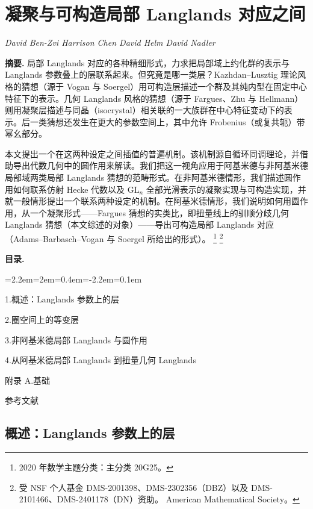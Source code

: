 \chapter{凝聚与可构造局部 Langlands 对应之间}
\begin{center}
{\small\itshape David Ben-Zvi \quad Harrison Chen \quad David Helm \quad David Nadler}
\end{center}
\medskip
\noindent\textbf{摘要.} 局部 Langlands 对应的各种精细形式，力求把局部域上约化群的表示与 Langlands 参数叠上的层联系起来。但究竟是哪一类层？Kazhdan--Lusztig 理论风格的猜想（源于 Vogan 与 Soergel）用可构造层描述一个群及其纯内型在固定中心特征下的表示。几何 Langlands 风格的猜想（源于 Fargues、Zhu 与 Hellmann）则用凝聚层描述与同晶（isocrystal）相关联的一大族群在中心特征变动下的表示。后一类猜想还发生在更大的参数空间上，其中允许 Frobenius（或复共轭）带幂幺部分。

本文提出一个在这两种设定之间插值的普遍机制。该机制源自循环同调理论，并借助导出代数几何中的圆作用来解读。我们把这一视角应用于阿基米德与非阿基米德局部域两类局部 Langlands 猜想的范畴形式。在非阿基米德情形，我们描述圆作用如何联系仿射 Hecke 代数以及 $\mathrm{GL}_n$ 全部光滑表示的凝聚实现与可构造实现，并就一般情形提出一个联系两种设定的机制。在阿基米德情形，我们说明如何用圆作用，从一个凝聚形式——Fargues 猜想的实类比，即扭量线上的驯顺分歧几何 Langlands 猜想（本文综述的对象）——导出可构造局部 Langlands 对应（Adams--Barbasch--Vogan 与 Soergel 所给出的形式）。
\footnote{2020 年数学主题分类：主分类 20G25。}
\footnote{受 NSF 个人基金 DMS-2001398、DMS-2302356（DBZ）以及 DMS-2101466、DMS-2401178（DN）资助。 American Mathematical Society。}

\medskip
\noindent\textbf{目录.}
\begin{list}{}{\leftmargin=2.2em=2em=0.4em\itemindent=-2.2em\itemsep=0.1em}
\item 1.\quad 概述：Langlands 参数上的层
\item 2.\quad 圈空间上的等变层
\item 3.\quad 非阿基米德局部 Langlands 与圆作用
\item 4.\quad 从阿基米德局部 Langlands 到扭量几何 Langlands
\item 附录 A.\quad 基础
\item 参考文献
\end{list}

\section{概述：Langlands 参数上的层}

